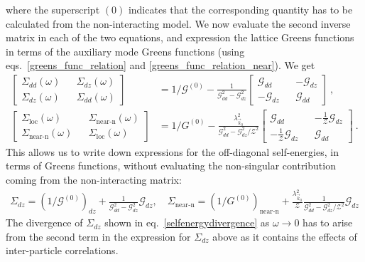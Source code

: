\documentclass[reprint,hidelinks,onecolumn]{revtex4-2}
\begin{document}
where the superscript \((0)\) indicates that the corresponding quantity has to be calculated from the non-interacting model. We now evaluate the second inverse matrix in each of the two equations, and expression the lattice Greens functions in terms of the auxiliary mode Greens functions (using eqs.~\ref{greens_func_relation} and \ref{greens_func_relation_near}). We get
\begin{equation}\begin{aligned}
	\begin{bmatrix} \Sigma_{dd}(\omega) && \Sigma_{dz}(\omega) \\ \Sigma_{dz}(\omega) && \Sigma_{dd}(\omega)\end{bmatrix} &= 1/\mathcal{G}^{(0)} - \frac{1}{\mathcal{G}_{dd}^2 - \mathcal{G}_{dz}^2}\begin{bmatrix} \mathcal{G}_{dd} && -\mathcal{G}_{dz} \\ -\mathcal{G}_{dz} && \mathcal{G}_{dd}\end{bmatrix}~,\\
	\begin{bmatrix} \Sigma_\text{loc}(\omega) && \Sigma_\text{near-n}(\omega) \\ \Sigma_\text{near-n}(\omega) && \Sigma_\text{loc}(\omega)\end{bmatrix} &= 1/G^{(0)} - \frac{\lambda_{\vec k_0}^2}{\mathcal{G}_{dd}^2 - \mathcal{G}_{dz}^2 / \mathcal{Z}^2}\begin{bmatrix} \mathcal{G}_{dd} && -\frac{1}{\mathcal{Z}}\mathcal{G}_{dz} \\ -\frac{1}{\mathcal{Z}}\mathcal{G}_{dz} && \mathcal{G}_{dd}\end{bmatrix}~.
\end{aligned}\end{equation}
This allows us to write down expressions for the off-diagonal self-energies, in terms of Greens functions, without evaluating the non-singular contribution coming from the non-interacting matrix:
\begin{equation}\begin{aligned}
	\Sigma_{dz} = \left(1/\mathcal{G}^{(0)}\right)_{dz} + \frac{1}{\mathcal{G}_{dd}^2 - \mathcal{G}_{dz}^2} \mathcal{G}_{dz},\quad \Sigma_\text{near-n} = \left(1/G^{(0)}\right)_\text{near-n} + \frac{\lambda_{\vec k_0}^2}{\mathcal{Z}}\frac{1}{\mathcal{G}_{dd}^2 - \mathcal{G}_{dz}^2 / \mathcal{Z}^2} \mathcal{G}_{dz}
\end{aligned}\end{equation}
The divergence of \(\Sigma_{dz}\) shown in eq.~\ref{selfenergydivergence} as \(\omega \to 0\) has to arise from the second term in the expression for \(\Sigma_{dz}\) above as it contains the effects of inter-particle correlations.
\end{document}
